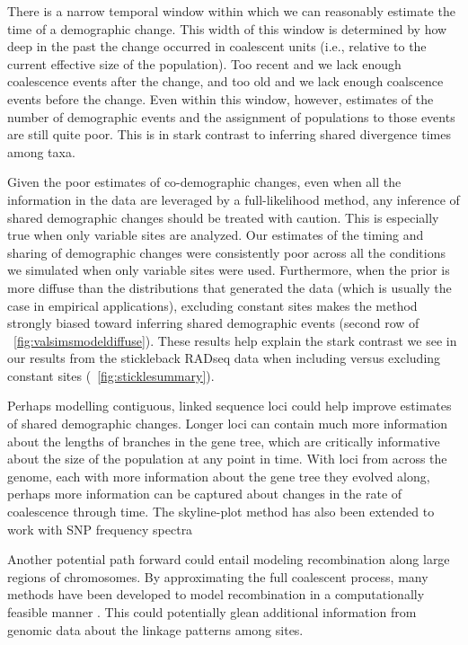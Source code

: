 There is a narrow temporal window within which we can reasonably estimate the
time of a demographic change.
This width of this window is determined by how deep in the past the change
occurred in coalescent units (i.e., relative to the current effective size of
the population).
Too recent and we lack enough coalescence events after the change, and too old
and we lack enough coalscence events before the change.
Even within this window, however, estimates of the number of demographic events
and the assignment of populations to those events are still quite poor.
This is in stark contrast to inferring shared divergence times among taxa.

Given the poor estimates of co-demographic changes, even when all the
information in the data are leveraged by a full-likelihood method, any
inference of shared demographic changes should be treated with caution.
This is especially true when only variable sites are analyzed.
Our estimates of the timing and sharing of demographic changes were
consistently poor across all the conditions we simulated when only variable
sites were used.
Furthermore, when the prior is more diffuse than the distributions that
generated the data (which is usually the case in empirical applications),
excluding constant sites makes the method strongly biased toward
inferring shared demographic events
(second row of \fig{}~\ref{fig:valsimsmodeldiffuse}).
These results help explain the stark contrast we see in our results from the
stickleback RADseq data when including versus excluding constant sites
(\fig{}~\ref{fig:sticklesummary}).

Perhaps modelling contiguous, linked sequence loci could help
improve estimates of shared demographic changes.
Longer loci can contain much more information about the lengths of branches in
the gene tree, which are critically informative about the size of the
population at any point in time.
With loci from across the genome, each with more information about the gene
tree they evolved along,
perhaps more information can be captured about changes in the rate of
coalescence through time.
\citep{Pybus2000,Strimmer2001,OpgenRhein2005,Drummond2005,Heled2008,Minin2008beast,Ho2011,Palacios2012,Palacios2012UAI,Stadler2013,Gill2013,Palacios2014,Lan2015,Karcher2016,Karcher2017,Faulkner2018,Karcher2019}
The skyline-plot method has also been extended to work with SNP frequency spectra \citep{LiuFu2015}

Another potential path forward could entail modeling recombination along large
regions of chromosomes.
By approximating the full coalescent process, many methods have been developed
to model recombination in a computationally feasible manner
\citep{McVean2005,Marjoram2006,Chen2009,Li2011,Sheehan2013,Schiffels2014,Rasmussen2014,Palacios2015}.
This could potentially glean additional information from genomic data about the
linkage patterns among sites.
